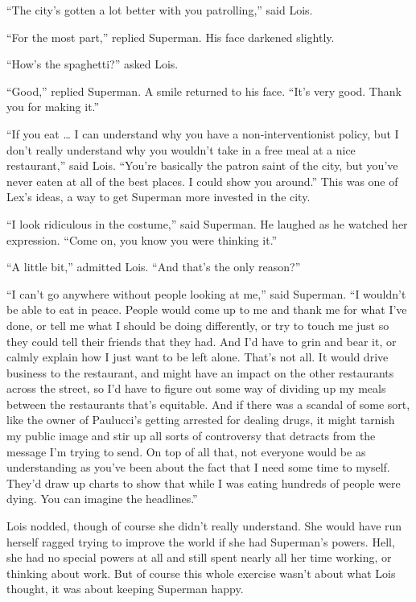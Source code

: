 ``The city's gotten a lot better with you patrolling,'' said Lois.

``For the most part,'' replied Superman. His face darkened slightly.

``How's the spaghetti?'' asked Lois.

``Good,'' replied Superman. A smile returned to his face. ``It's very
good. Thank you for making it.''

``If you eat \ldots{} I can understand why you have a
non‐interventionist policy, but I don't really understand why you
wouldn't take in a free meal at a nice restaurant,'' said Lois. ``You're
basically the patron saint of the city, but you've never eaten at all of
the best places. I could show you around.'' This was one of Lex's ideas,
a way to get Superman more invested in the city.

``I look ridiculous in the costume,'' said Superman. He laughed as he
watched her expression. ``Come on, you know you were thinking it.''

``A little bit,'' admitted Lois. ``And that's the only reason?''

``I can't go anywhere without people looking at me,'' said Superman. ``I
wouldn't be able to eat in peace. People would come up to me and thank
me for what I've done, or tell me what I should be doing differently, or
try to touch me just so they could tell their friends that they had. And
I'd have to grin and bear it, or calmly explain how I just want to be
left alone. That's not all. It would drive business to the restaurant,
and might have an impact on the other restaurants across the street, so
I'd have to figure out some way of dividing up my meals between the
restaurants that's equitable. And if there was a scandal of some sort,
like the owner of Paulucci's getting arrested for dealing drugs, it
might tarnish my public image and stir up all sorts of controversy that
detracts from the message I'm trying to send. On top of all that, not
everyone would be as understanding as you've been about the fact that I
need some time to myself. They'd draw up charts to show that while I was
eating hundreds of people were dying. You can imagine the headlines.''

Lois nodded, though of course she didn't really understand. She would
have run herself ragged trying to improve the world if she had
Superman's powers. Hell, she had no special powers at all and still
spent nearly all her time working, or thinking about work. But of course
this whole exercise wasn't about what Lois thought, it was about keeping
Superman happy.

